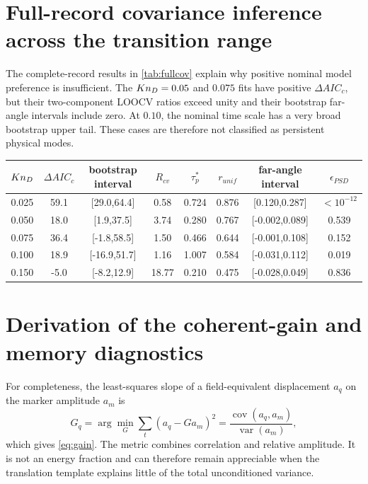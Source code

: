 \section{Full-record covariance inference across the transition range}
The complete-record results in \cref{tab:fullcov} explain why positive nominal model preference is insufficient. The $Kn_D=0.05$ and $0.075$ fits have positive $\Delta AIC_c$, but their two-component LOOCV ratios exceed unity and their bootstrap far-angle intervals include zero. At $0.10$, the nominal time scale has a very broad bootstrap upper tail. These cases are therefore not classified as persistent physical modes.

\begin{center}
\label{tab:fullcov}
\scriptsize
\begin{tabular}{cccccccc}
\toprule
$Kn_D$ & $\Delta AIC_c$ & bootstrap interval & $R_{cv}$ & $\tau_p^*$ & $r_{unif}$ & far-angle interval & $\epsilon_{PSD}$\\
\midrule
0.025 & 59.1 & [29.0,64.4] & 0.58 & 0.724 & 0.876 & [0.120,0.287] & $<10^{-12}$\\
0.050 & 18.0 & [1.9,37.5] & 3.74 & 0.280 & 0.767 & [-0.002,0.089] & 0.539\\
0.075 & 36.4 & [-1.8,58.5] & 1.50 & 0.466 & 0.644 & [-0.001,0.108] & 0.152\\
0.100 & 18.9 & [-16.9,51.7] & 1.16 & 1.007 & 0.584 & [-0.031,0.112] & 0.019\\
0.150 & -5.0 & [-8.2,12.9] & 18.77 & 0.210 & 0.475 & [-0.028,0.049] & 0.836\\
\bottomrule
\end{tabular}
\end{center}

\section{Derivation of the coherent-gain and memory diagnostics}
For completeness, the least-squares slope of a field-equivalent displacement $a_q$ on the marker amplitude $a_m$ is
\begin{equation}
 \widehat G_q=\arg\min_G\sum_t(a_q-Ga_m)^2
 =\frac{\operatorname{cov}(a_q,a_m)}{\operatorname{var}(a_m)},
\end{equation}
which gives \cref{eq:gain}. The metric combines correlation and relative amplitude. It is not an energy fraction and can therefore remain appreciable when the translation template explains little of the total unconditioned variance.

